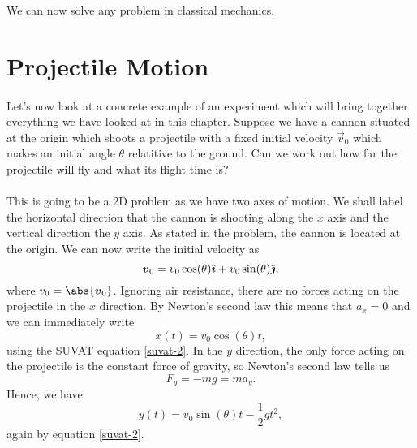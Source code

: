 \documentclass[../classical_mechanics.tex]{subfiles}
\begin{document}
        We can now solve any problem in classical mechanics.

    \section{Projectile Motion}
        \paragraph{}
        Let's now look at a concrete example of an experiment which will bring together everything we have looked at in this chapter.
        Suppose we have a cannon situated at the origin which shoots a projectile with a fixed initial velocity $\vec{v}_0$ which makes an initial angle $\theta$ relatitive to the ground.
        Can we work out how far the projectile will fly and what its flight time is?
        \paragraph{}
        This is going to be a 2D problem as we have two axes of motion.
        We shall label the horizontal direction that the cannon is shooting along the $x$ axis and the vertical direction the $y$ axis.
        As stated in the problem, the cannon is located at the origin.
        We can now write the initial velocity as
        \begin{equation}
            \boldsymbol{v}_0 = v_0\cos(\theta)\hat{\boldsymbol{\imath}} + v_0\sin(\theta)\hat{\boldsymbol{\jmath}},
        \end{equation}
        where $v_0=\abs{\vec{v}_0}$.
        Ignoring air resistance, there are no forces acting on the projectile in the $x$ direction.
        By Newton's second law this means that $a_x=0$ and we can immediately write
        \begin{equation}
            x(t) = v_0\cos(\theta)t,
        \end{equation}
        using the SUVAT equation \ref{suvat-2}.
        In the $y$ direction, the only force acting on the projectile is the constant force of gravity, so Newton's second law tells us
        \begin{equation}
            F_y = -mg = ma_y.
        \end{equation}
        Hence, we have
        \begin{equation}
            y(t) = v_0\sin(\theta)t - \frac{1}{2}gt^2,
        \end{equation}
        again by equation \ref{suvat-2}.
\end{document}
